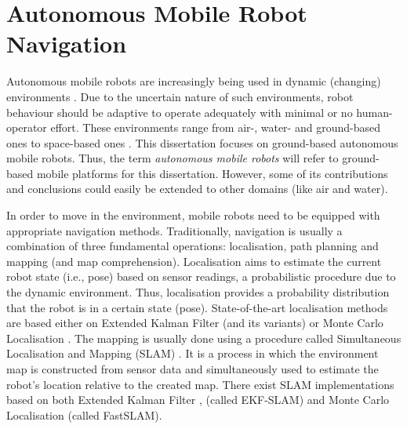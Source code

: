 \section{Autonomous Mobile Robot Navigation}

Autonomous mobile robots are increasingly being used in dynamic (changing) environments \cite{Kunze2018,Guiochet2017,Ramachandram2017,BoninFont2008,Jarvis2008}. Due to the uncertain nature of such environments, robot behaviour should be adaptive to operate adequately with minimal or no human-operator effort. These environments range from air-, water- and ground-based ones to space-based ones \cite{Kunze2018,BoninFont2008}. This dissertation focuses on ground-based autonomous mobile robots. Thus, the term \emph{autonomous mobile robots} will refer to ground-based mobile platforms for this dissertation. However, some of its contributions and conclusions could easily be extended to other domains (like air and water).

In order to move in the environment, mobile robots need to be equipped with appropriate navigation methods. Traditionally, navigation is usually a combination of three fundamental operations: localisation, path planning and mapping (and map comprehension). Localisation aims to estimate the current robot state (i.e., pose) based on sensor readings, a probabilistic procedure due to the dynamic environment. Thus, localisation provides a probability distribution that the robot is in a certain state (pose). State-of-the-art localisation methods are based either on Extended Kalman Filter \cite{Jetto1999,Moore2015} (and its variants) or Monte Carlo Localisation \cite{Dellaert1999,Thrun2006}. The mapping is usually done using a procedure called Simultaneous Localisation and Mapping (SLAM) \cite{Leonard1991,DurrantWhyte2006}. It is a process in which the environment map is constructed from sensor data and simultaneously used to estimate the robot's location relative to the created map. There exist SLAM implementations based on both Extended Kalman Filter \cite{Dissanayake2001,Leonard2000,Guivant2001}, (called EKF-SLAM) and Monte Carlo Localisation \cite{Montemerlo2002,Montemerlo2003} (called FastSLAM).

